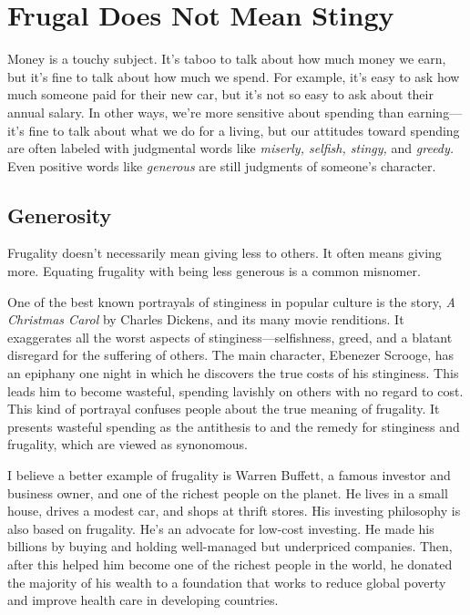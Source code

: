 \chapter{Frugal Does Not Mean Stingy}

Money is a touchy subject. It's taboo to talk about how much money we earn, but it's fine to talk about how much we spend. For example, it's easy to ask how much someone paid for their new car, but it's not so easy to ask about their annual salary. In other ways, we're more sensitive about spending than earning---it's fine to talk about what we do for a living, but our attitudes toward spending are often labeled with judgmental words like \emph{miserly, selfish, stingy,} and \emph{greedy.} Even positive words like \emph{generous} are still judgments of someone's character.

\section{Generosity}
Frugality doesn't necessarily mean giving less to others. It often means giving more. Eq\-uating frugality with being less generous is a common misnomer.

One of the best known portrayals of stinginess in popular culture is the story, \emph{A Christmas Carol} by Charles Dickens, and its many movie renditions. It exaggerates all the worst aspects of stinginess---selfishness, greed, and a blatant disregard for the suffering of others. The main character, Ebenezer Scrooge, has an epiphany one night in which he discovers the true costs of his stinginess. This leads him to become wasteful, spending lavishly on others with no regard to cost. This kind of portrayal confuses people about the true meaning of frugality. It presents wasteful spending as the antithesis to and the remedy for stinginess and frugality, which are viewed as synonomous.

I believe a better example of frugality is Warren Buffett, a famous investor and business owner, and one of the richest people on the planet. He lives in a small house, drives a modest car, and shops at thrift stores. His investing philosophy is also based on frugality. He's an advocate for low-cost investing. He made his billions by buying and holding well-managed but underpriced companies. Then, after this helped him become one of the richest people in the world, he donated the majority of his wealth to a foundation that works to reduce global poverty and improve health care in developing countries.

